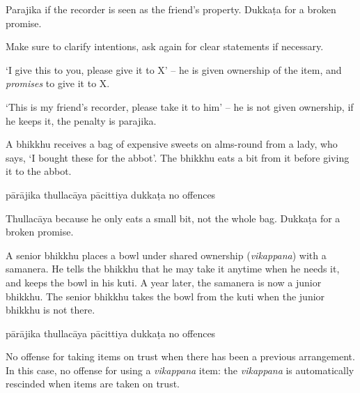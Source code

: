 \begin{exam}{\autoExamName}
\begin{problem*}
\begin{parts}
  \begin{solution}
    Parajika if the recorder is seen as the friend's property.
    Dukkaṭa for a broken promise.

    Make sure to clarify intentions, ask again for
    clear statements if necessary.

    `I give this to you, please give it to X' -- he is given ownership of the
    item, and \emph{promises} to give it to X.

    `This is my friend's recorder, please take it to him' -- he is not given
    ownership, if he keeps it, the penalty is parajika.
  \end{solution}

  \bigskip

  \item A bhikkhu receives a bag of expensive sweets on alms-round from a lady, who
  says, `I bought these for the abbot'. The bhikkhu eats a bit from it before giving it
  to the abbot.

  \bigskip

  \begin{answers}{5}
    \bChoices
     pārājika\eAns
     thullacāya\eAns
     pācittiya\eAns
     dukkaṭa\eAns
     no offences\eAns
    \eChoices
  \end{answers}

  \begin{solution}
    Thullacāya because he only eats a small bit, not the whole bag. Dukkaṭa for a broken promise.
  \end{solution}

  \bigskip

  \item A senior bhikkhu places a bowl under shared ownership (\emph{vikappana}) with a samanera.
  He tells the bhikkhu that he may take it anytime when he needs it, and keeps the bowl in his kuti.
  A year later, the samanera is now a junior bhikkhu.
  The senior bhikkhu takes the bowl from the kuti when the junior bhikkhu is not there.

  \bigskip

  \begin{answers}{5}
    \bChoices
     pārājika\eAns
     thullacāya\eAns
     pācittiya\eAns
     dukkaṭa\eAns
     no offences\eAns
    \eChoices
  \end{answers}

  \begin{solution}
    No offense for taking items on trust when there has been a previous
    arrangement. In this case, no offense for using a \textit{vikappana} item:
    the \emph{vikappana} is automatically rescinded when items are taken on
    trust.
  \end{solution}


\end{parts}
\end{problem*}
\end{exam}
